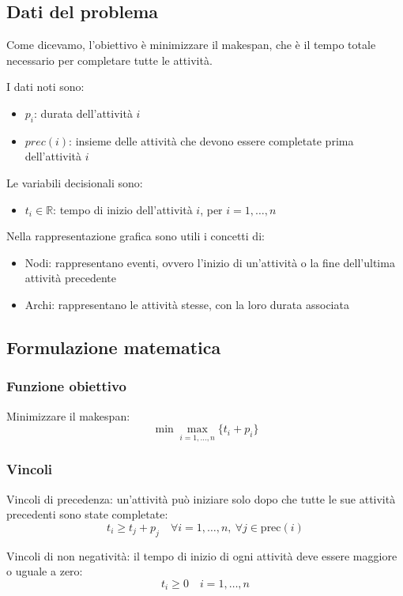 \subsection{Dati del problema}
Come dicevamo, l'obiettivo è minimizzare il makespan, che è il tempo totale necessario per completare tutte le attività.

I dati noti sono:
\begin{itemize}
    \item $p_i$: durata dell'attività $i$
    \item $prec(i)$: insieme delle attività che devono essere completate prima dell'attività $i$
\end{itemize}

Le variabili decisionali sono:
\begin{itemize}
    \item $t_i \in \mathbb{R}$: tempo di inizio dell'attività $i$, per $i=1,\ldots,n$
\end{itemize}

Nella rappresentazione grafica sono utili i concetti di:
\begin{itemize}
    \item Nodi: rappresentano eventi, ovvero l'inizio di un'attività o la fine dell'ultima attività precedente
    \item Archi: rappresentano le attività stesse, con la loro durata associata
\end{itemize}

\subsection{Formulazione matematica}
\subsubsection{Funzione obiettivo}
Minimizzare il makespan:
\[ 
\min \max_{i=1,\dots,n} \{ t_i + p_i \}
\]

\subsubsection{Vincoli}
Vincoli di precedenza: un'attività può iniziare solo dopo che tutte le sue attività precedenti sono state completate:
\[ 
t_i \geq t_j + p_j \quad \forall i = 1,\dots,n,\ \forall j \in \text{prec}(i)
\]

Vincoli di non negatività: il tempo di inizio di ogni attività deve essere maggiore o uguale a zero:
\[ 
t_i \geq 0 \quad i = 1,\dots,n
\]

